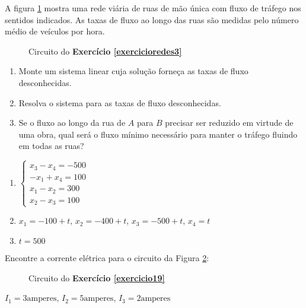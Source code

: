 \documentclass[12pt]{exam}
\begin{document}
\begin{exercicio}\label{exercicioredes3}
  A figura \ref{exercicio3redesanton} mostra uma rede viária de ruas de mão única com fluxo de tráfego nos sentidos indicados. As taxas
  de fluxo ao longo das ruas são medidas pelo número médio de veículos por hora.
  \begin{figure}[!h]
  	\centering
  	
    \caption{Circuito do \textbf{Exercício \ref{exercicioredes3}}}
    \label{exercicio3redesanton}
  \end{figure}

  \begin{enumerate}
    \item Monte um sistema linear cuja solução forneça as taxas de fluxo desconhecidas.
    \item Resolva o sistema para as taxas de fluxo desconhecidas.
    \item Se o fluxo ao longo da rua de $A$ para $B$ precisar ser reduzido em virtude de uma obra, qual será o fluxo mínimo necessário para manter o tráfego fluindo em todas as ruas?
  \end{enumerate}
  \begin{solucao}
    \begin{enumerate}
      \item $\begin{cases}x_3 - x_4 = -500\\-x_1 + x_4 = 100\\x_1 - x_2 = 300\\x_2 - x_3 = 100\end{cases}$
      \item $x_1 = -100 +t$, $x_2 = -400 + t$, $x_3 = -500 + t$, $x_4 = t$
      \item $t = 500$
    \end{enumerate}
  \end{solucao}
\end{exercicio}

\begin{exercicio}\label{exercicio19}
  Encontre a corrente elétrica para o circuito da Figura \ref{exercicio19circuitopoole}:
    \begin{figure}[!h]
      \centering
      
      \caption{Circuito do \textbf{Exercício \ref{exercicio19}}}
    \label{exercicio19circuitopoole}
    \end{figure}

  \begin{solucao}
    $I_1 = 3 \mbox{amperes}$,
    $I_2 = 5 \mbox{amperes}$,
    $I_3 = 2 \mbox{amperes}$
  \end{solucao}
\end{exercicio}
\end{document}

